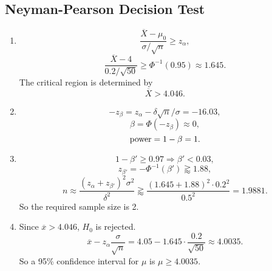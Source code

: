 \documentclass[11pt,a4paper]{article}
\begin{document}
\subsection{Neyman-Pearson Decision Test}

\begin{enumerate}[label=\roman*)]
\item
$$\frac{\overline{X}-\mu_0}{\sigma/\sqrt{n}}\geqslant z_{\alpha},$$
$$\frac{\overline{X}-4}{0.2/\sqrt{50}}\geqslant\Phi^{-1}(0.95)\approx1.645.$$
The critical region is determined by
$$\overline{X}>4.046.$$
\item
$$-z_{\beta}=z_\alpha-\delta\sqrt{n}/\sigma=-16.03,$$
$$\beta=\Phi(-z_{\beta})\approx 0,$$
$${\rm power}=1-\beta=1.$$
\item
$$1-\beta'\geqslant0.97\Longrightarrow\beta'<0.03,$$
$$z_{\beta'}=-\Phi^{-1}(\beta')\gtrapprox 1.88,$$
$$n\approx\frac{(z_\alpha+z_{\beta'})^2\sigma^2}{\delta^2}\gtrapprox\frac{(1.645+1.88)^2\cdot0.2^2}{0.5^2}=1.9881.$$
So the required sample size is 2.
\item
Since $\overline{x}>4.046$, $H_0$ is rejected.
$$\overline{x}-z_\alpha\frac{\sigma}{\sqrt{n}}=4.05-1.645\cdot\frac{0.2}{\sqrt{50}}\approx4.0035.$$
So a 95\% confidence interval for $\mu$ is $\mu\geqslant4.0035$.
\end{enumerate}

\subsection{}
\end{document}
